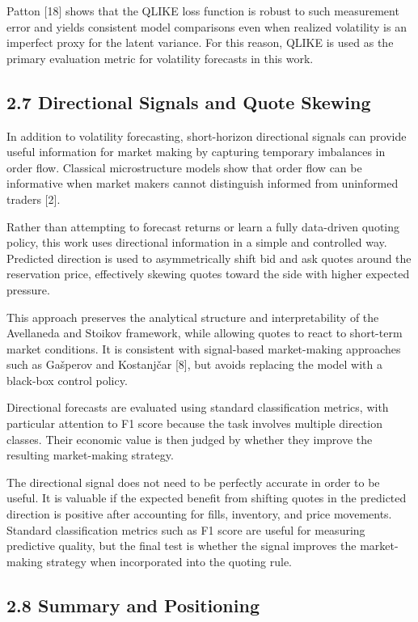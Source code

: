 \documentclass[12pt,a4paper]{article}
\begin{document}
Patton {[}18{]} shows that the QLIKE loss function is robust to such
measurement error and yields consistent model comparisons even when
realized volatility is an imperfect proxy for the latent variance. For
this reason, QLIKE is used as the primary evaluation metric for
volatility forecasts in this work.

\subsection{2.7 Directional Signals and Quote
Skewing}\label{directional-signals-and-quote-skewing}

In addition to volatility forecasting, short-horizon directional signals
can provide useful information for market making by capturing temporary
imbalances in order flow. Classical microstructure models show that
order flow can be informative when market makers cannot distinguish
informed from uninformed traders {[}2{]}.

Rather than attempting to forecast returns or learn a fully data-driven
quoting policy, this work uses directional information in a simple and
controlled way. Predicted direction is used to asymmetrically shift bid
and ask quotes around the reservation price, effectively skewing quotes
toward the side with higher expected pressure.

This approach preserves the analytical structure and interpretability of
the Avellaneda and Stoikov framework, while allowing quotes to react to
short-term market conditions. It is consistent with signal-based
market-making approaches such as Gašperov and Kostanjčar {[}8{]}, but
avoids replacing the model with a black-box control policy.

Directional forecasts are evaluated using standard classification
metrics, with particular attention to F1 score because the task involves
multiple direction classes. Their economic value is then judged by
whether they improve the resulting market-making strategy.

The directional signal does not need to be perfectly accurate in order
to be useful. It is valuable if the expected benefit from shifting
quotes in the predicted direction is positive after accounting for
fills, inventory, and price movements. Standard classification metrics
such as F1 score are useful for measuring predictive quality, but the
final test is whether the signal improves the market-making strategy
when incorporated into the quoting rule.

\subsection{2.8 Summary and Positioning}\label{summary-and-positioning}
\end{document}
